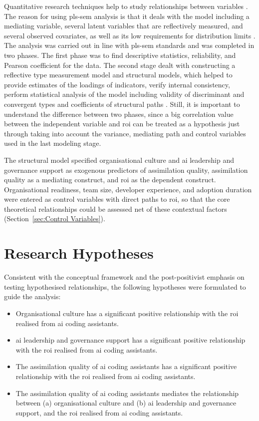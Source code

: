 Quantitative research techniques help to study relationships between variables \autocite{Bryman2016}. The reason for using \gls{pls-sem} analysis is that it deals with the model including a mediating variable, several latent variables that are reflectively measured, and several observed covariates, as well as its low requirements for distribution limits \autocite{Hair2019}. The analysis was carried out in line with \gls{pls-sem} standards and was completed in two phases. The first phase was to find descriptive statistics, reliability, and Pearson coefficient for the data. The second stage dealt with constructing a reflective type measurement model and structural models, which helped to provide estimates of the loadings of indicators, verify internal consistency, perform statistical analysis of the model including validity of discriminant and convergent types and coefficients of structural paths \autocite{Hair2019}. Still, it is important to understand the difference between two phases, since a big correlation value between the independent variable and \gls{roi} can be treated as a hypothesis just through taking into account the variance, mediating path and control variables used in the last modeling stage.

The structural model specified organisational culture and \gls{ai} leadership and governance support as exogenous predictors of assimilation quality, assimilation quality as a mediating construct, and \gls{roi} as the dependent construct. Organisational readiness, team size, developer experience, and adoption duration were entered as control variables with direct paths to \gls{roi}, so that the core theoretical relationships could be assessed net of these contextual factors (Section~\ref{sec:Control Variables}).

\section{Research Hypotheses}
\label{sec:Research Hypotheses}
Consistent with the conceptual framework and the post-positivist emphasis on testing hypothesised relationships, the following hypotheses were formulated to guide the analysis:

\begin{itemize}
	\item[\textbf{H1:}] Organisational culture has a significant positive relationship with the \gls{roi} realised from \gls{ai} coding assistants.
	\item[\textbf{H2:}] \gls{ai} leadership and governance support has a significant positive relationship with the \gls{roi} realised from \gls{ai} coding assistants.
	\item[\textbf{H3:}] The assimilation quality of \gls{ai} coding assistants has a significant positive relationship with the \gls{roi} realised from \gls{ai} coding assistants.
	\item[\textbf{H4:}] The assimilation quality of \gls{ai} coding assistants mediates the relationship between (a) organisational culture and (b) \gls{ai} leadership and governance support, and the \gls{roi} realised from \gls{ai} coding assistants.
\end{itemize}


